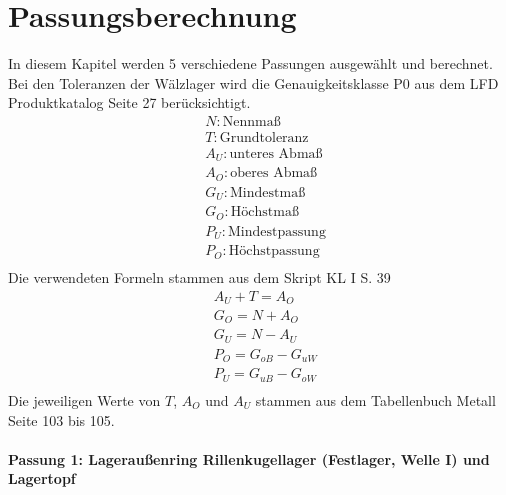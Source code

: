 \chapter{Passungsberechnung}
\flushleft
In diesem Kapitel werden 5 verschiedene Passungen ausgewählt und berechnet. Bei den Toleranzen der Wälzlager wird die Genauigkeitsklasse P0 aus dem LFD Produktkatalog Seite 27 berücksichtigt.
\begin{align*}
	&N : \text{Nennmaß} \\
	&T : \text{Grundtoleranz} \\
	&A_U : \text{unteres Abmaß} \\
	&A_O : \text{oberes Abmaß} \\
	&G_U : \text{Mindestmaß} \\
	&G_O : \text{Höchstmaß} \\
	&P_U : \text{Mindestpassung} \\
	&P_O : \text{Höchstpassung} \\
\end{align*}
Die verwendeten Formeln stammen aus dem Skript KL I S. 39
\begin{align*}
	&A_U + T = A_O \\
	&G_O = N + A_O \\
	&G_U = N - A_U \\
	&P_O = G_{oB} - G_{uW}\\
	&P_U = G_{uB} - G_{oW}\\
\end{align*}
Die jeweiligen Werte von $T$, $A_O$ und $A_U$ stammen aus dem Tabellenbuch Metall Seite 103 bis 105. 
\newpage
\subsubsection{Passung 1: Lageraußenring Rillenkugellager (Festlager, Welle I) und Lagertopf}

